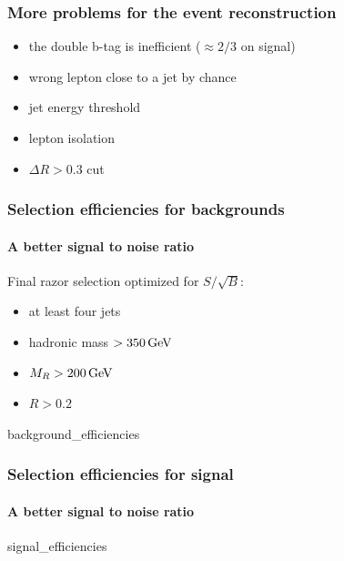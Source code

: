 \documentclass[ukenglish]{beamer}
\begin{document}
\begin{frame}
    \frametitle{More problems for the event reconstruction}
    \begin{itemize}
        \item the double b-tag is inefficient ($\approx 2/3$ on signal)
        \item wrong lepton close to a jet by chance
        \item jet energy threshold
        \item lepton isolation
        \item $\Delta R > 0.3$ cut
    \end{itemize}
\end{frame}

\begin{frame}
    \frametitle{Selection efficiencies for backgrounds}
    \framesubtitle{A better signal to noise ratio}
    Final razor selection optimized for $S/\sqrt{B}$:
    \begin{itemize}
        \item at least four jets
        \item hadronic mass $>\unit[350]{GeV}$
        \item $M_R > \unit[200]{GeV}$
        \item $R > 0.2$
    \end{itemize}
    {background_efficiencies}
\end{frame}

\begin{frame}
    \frametitle{Selection efficiencies for signal}
    \framesubtitle{A better signal to noise ratio}
    {signal_efficiencies}
\end{frame}
\end{document}
